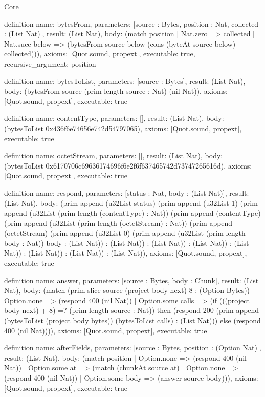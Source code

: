 \begin{lexlean}{Core}
\begin{semanticmodule}
definition{
  name: bytesFrom,
  parameters: [source : Bytes, position : Nat, collected : (List Nat)],
  result: (List Nat),
  body: (match position
    | Nat.zero => collected
    | Nat.succ below => (bytesFrom source below (cons (byteAt source below) collected))),
  axioms: [Quot.sound, propext],
  executable: true,
  recursive_argument: position
}

definition{
  name: bytesToList,
  parameters: [source : Bytes],
  result: (List Nat),
  body: (bytesFrom source (prim length source : Nat) (nil Nat)),
  axioms: [Quot.sound, propext],
  executable: true
}

definition{
  name: contentType,
  parameters: [],
  result: (List Nat),
  body: (bytesToList 0x436f6e74656e742d54797065),
  axioms: [Quot.sound, propext],
  executable: true
}

definition{
  name: octetStream,
  parameters: [],
  result: (List Nat),
  body: (bytesToList 0x6170706c69636174696f6e2f6f637465742d73747265616d),
  axioms: [Quot.sound, propext],
  executable: true
}

definition{
  name: respond,
  parameters: [status : Nat, body : (List Nat)],
  result: (List Nat),
  body: (prim append (u32List status) (prim append (u32List 1) (prim append (u32List (prim length (contentType) : Nat)) (prim append (contentType) (prim append (u32List (prim length (octetStream) : Nat)) (prim append (octetStream) (prim append (u32List 0) (prim append (u32List (prim length body : Nat)) body : (List Nat)) : (List Nat)) : (List Nat)) : (List Nat)) : (List Nat)) : (List Nat)) : (List Nat)) : (List Nat)),
  axioms: [Quot.sound, propext],
  executable: true
}

definition{
  name: answer,
  parameters: [source : Bytes, body : Chunk],
  result: (List Nat),
  body: (match (prim slice source (project body next) 8 : (Option Bytes))
    | Option.none => (respond 400 (nil Nat))
    | Option.some calls => (if (((project body next) + 8) =? (prim length source : Nat)) then (respond 200 (prim append (bytesToList (project body bytes)) (bytesToList calls) : (List Nat))) else (respond 400 (nil Nat)))),
  axioms: [Quot.sound, propext],
  executable: true
}

definition{
  name: afterFields,
  parameters: [source : Bytes, position : (Option Nat)],
  result: (List Nat),
  body: (match position
    | Option.none => (respond 400 (nil Nat))
    | Option.some at => (match (chunkAt source at)
      | Option.none => (respond 400 (nil Nat))
      | Option.some body => (answer source body))),
  axioms: [Quot.sound, propext],
  executable: true
}


\end{semanticmodule}
\end{lexlean}
